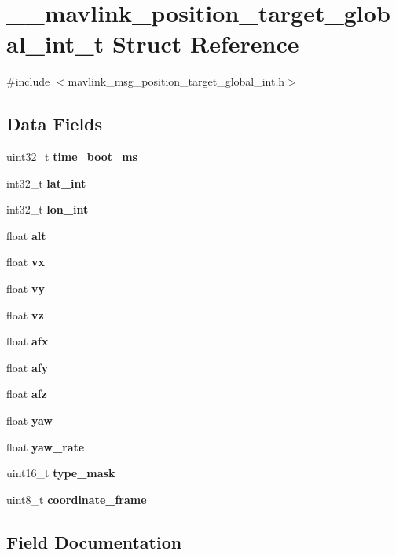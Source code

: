 \section{\+\_\+\+\_\+mavlink\+\_\+position\+\_\+target\+\_\+global\+\_\+int\+\_\+t Struct Reference}
\label{struct____mavlink__position__target__global__int__t}


{\ttfamily \#include $<$mavlink\+\_\+msg\+\_\+position\+\_\+target\+\_\+global\+\_\+int.\+h$>$}

\subsection*{Data Fields}
\begin{DoxyCompactItemize}
\item 
uint32\+\_\+t \textbf{ time\+\_\+boot\+\_\+ms}
\item 
int32\+\_\+t \textbf{ lat\+\_\+int}
\item 
int32\+\_\+t \textbf{ lon\+\_\+int}
\item 
float \textbf{ alt}
\item 
float \textbf{ vx}
\item 
float \textbf{ vy}
\item 
float \textbf{ vz}
\item 
float \textbf{ afx}
\item 
float \textbf{ afy}
\item 
float \textbf{ afz}
\item 
float \textbf{ yaw}
\item 
float \textbf{ yaw\+\_\+rate}
\item 
uint16\+\_\+t \textbf{ type\+\_\+mask}
\item 
uint8\+\_\+t \textbf{ coordinate\+\_\+frame}
\end{DoxyCompactItemize}


\subsection{Field Documentation}
\mbox{\label{struct____mavlink__position__target__global__int__t_a7db44bb9672bc444e2aeab70335bb864}} 
